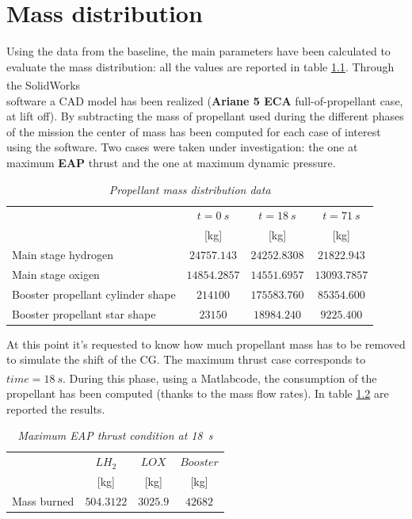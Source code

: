 \documentclass[12pt,fleqn,openany]{book} %
\begin{document}
\chapter{Mass distribution}\label{chap:mass}
Using the data from the baseline, the main parameters have been calculated to evaluate the mass distribution: all the values are reported in table \hypertarget{tab:mdata}{\ref{tab:mdata}}. Through the SolidWorks\textsuperscript\textregistered \\software a CAD model has been realized (\textbf{Ariane 5 ECA} full-of-propellant case, at lift off). By subtracting the mass of propellant used during the different phases of the mission the center of mass has been computed for each case of interest using the software. Two cases were taken under investigation: the one at maximum \textbf{EAP} thrust and the one at maximum dynamic pressure. 

\begin{table}[h]
	\centering
	\begin{tabular}{ l c c c}
\toprule
										&$t=\SI{0}{s}$ 			&$t = \SI{18}{s}$ 		&$t = \SI{71}{s}$	\\
										&[\si{\kilogram}]			&[\si{\kilogram}]			&[\si{\kilogram}]		\\
\midrule                                                                                                             
Main stage hydrogen 					&$24757.143 $			&$24252.8308$			&$21822.943 $		\\
Main stage oxigen 						&$14854.2857$			&$14551.6957$			&$13093.7857$        \\
Booster propellant cylinder shape 		&$214100	   $		&	$175583.760$		&	$85354.600 $        \\
Booster propellant star shape 			&$23150	   $			&$18984.240 $			&$9225.400  $        \\
\bottomrule
\end{tabular} 
\caption{\emph{Propellant mass distribution data}}
\label{tab:mdata}
\end{table}
\noindent At this point it’s requested to know how much propellant mass has to be removed to simulate the shift of the CG. The maximum thrust case corresponds to $time = \SI{18}{s}$. During this phase, using a Matlab\textsuperscript\textregistered code, the consumption of the propellant has been computed (thanks to the mass flow rates). In table \hypertarget{tab:maxEAP}{\ref{tab:maxEAP}} are reported the results. 
\begin{table}[h]
	\centering
	\begin{tabular}{ l c c c}
\toprule
										&$LH_2$ 			&$LOX$ 				&$Booster$	\\
										&[\si{\kilogram}]			&[\si{\kilogram}]			&[\si{\kilogram}]		\\
\midrule                                                                                                             
Mass burned								&$504.3122$			&$3025.9$			&$42682$			\\
\bottomrule
\end{tabular} 
\caption{\emph{Maximum EAP thrust condition at \SI{18}{s}}}        
\label{tab:maxEAP}                       
\end{table}                             
                      
\end{document}
